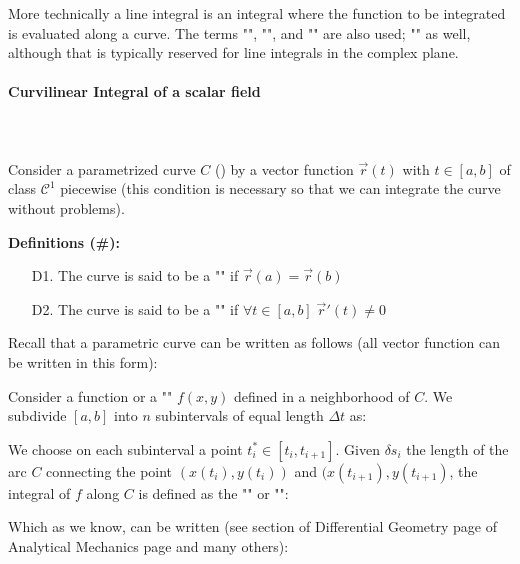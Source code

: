 	More technically a line integral is an integral where the function to be integrated is evaluated along a curve. The terms "", "", and "" are also used; "" as well, although that is typically reserved for line integrals in the complex plane.
	
	\paragraph{Curvilinear Integral of a scalar field}\mbox{}\\\\
	Consider a parametrized curve $C$ () by a vector function $\vec{r}(t)$ with $t \in [a,b]$ of class $\mathcal{C}^1$ piecewise (this condition is necessary so that we can integrate the curve without problems).
	
	\textbf{Definitions (\#\mydef):}
	 \begin{enumerate}
	 	\item[D1.] The curve is said to be a "" if $\vec{r}(a)=\vec{r}(b)$
	 	
	 	\item[D2.] The curve is said to be a "" if $\forall t \in [a,b]\; \vec{r}'(t)\neq 0$
	 \end{enumerate}
	 Recall that a parametric curve can be written as follows (all vector function can be written in this form):
	 
	Consider a function or a "" $f(x,y)$ defined in a neighborhood of $C$. We subdivide $[a,b]$ into $n$ subintervals of equal length $\Delta t$ as:
	
	We choose on each subinterval a point $t_i^*\in [t_i,t_{i+1}]$. Given $\delta s_i$ the length of the arc $C$ connecting the point $(x(t_i),y(t_i))$ and $(x(t_{i+1}),y(t_{i+1})$, the integral of $f$ along $C$ is defined as the "" or "":
	
	Which as we know, can be written (see section of Differential Geometry page \pageref{curvilinear abscissa helix} of Analytical Mechanics page \pageref{parametric curve length} and many others):
	
